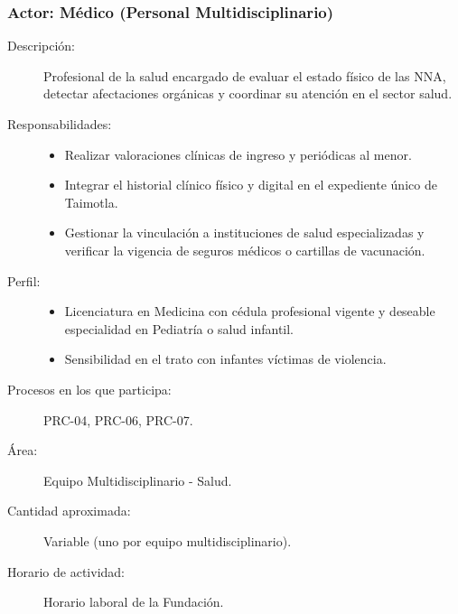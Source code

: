 \subsubsection{Actor: Médico (Personal Multidisciplinario)}
\begin{description}
	\item[Descripción:] Profesional de la salud encargado de evaluar el estado físico de las NNA, detectar afectaciones orgánicas y coordinar su atención en el sector salud.
	\item[Responsabilidades:] \cdtEmpty
		\begin{itemize}
			\item Realizar valoraciones clínicas de ingreso y periódicas al menor.
			\item Integrar el historial clínico físico y digital en el expediente único de Taimotla.
			\item Gestionar la vinculación a instituciones de salud especializadas y verificar la vigencia de seguros médicos o cartillas de vacunación.
		\end{itemize}
	\item[Perfil:] \cdtEmpty
		\begin{itemize}
			\item Licenciatura en Medicina con cédula profesional vigente y deseable especialidad en Pediatría o salud infantil.
			\item Sensibilidad en el trato con infantes víctimas de violencia.
		\end{itemize}
	\item[Procesos en los que participa:] PRC-04, PRC-06, PRC-07.
	\item[Área:] Equipo Multidisciplinario - Salud.
	\item[Cantidad aproximada:] Variable (uno por equipo multidisciplinario).
	\item[Horario de actividad:] Horario laboral de la Fundación.
\end{description}

